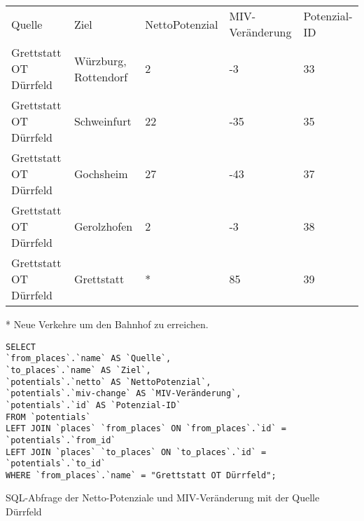 \begin{tabular}{ l  l  l  l  l }
Quelle & Ziel & NettoPotenzial & MIV-Veränderung & Potenzial-ID\\ 
Grettstatt OT Dürrfeld & Würzburg, Rottendorf & 2 & -3 & 33\\ 
Grettstatt OT Dürrfeld & Schweinfurt & 22 & -35 & 35\\ 
Grettstatt OT Dürrfeld & Gochsheim & 27 & -43 & 37\\ 
Grettstatt OT Dürrfeld & Gerolzhofen & 2 & -3 & 38\\ 
Grettstatt OT Dürrfeld & Grettstatt & * & 85 & 39\\ 
\end{tabular}       
\newline
\newline
* Neue Verkehre um den Bahnhof zu erreichen.
\newline
\begin{listing}[htbp]
\begin{verbatim}
SELECT
`from_places`.`name` AS `Quelle`, 
`to_places`.`name` AS `Ziel`, 
`potentials`.`netto` AS `NettoPotenzial`, 
`potentials`.`miv-change` AS `MIV-Veränderung`, 
`potentials`.`id` AS `Potenzial-ID`
FROM `potentials`
LEFT JOIN `places` `from_places` ON `from_places`.`id` = `potentials`.`from_id`
LEFT JOIN `places` `to_places` ON `to_places`.`id` = `potentials`.`to_id`
WHERE `from_places`.`name` = "Grettstatt OT Dürrfeld";
\end{verbatim}
\caption{SQL-Abfrage der Netto-Potenziale und MIV-Veränderung mit der Quelle Dürrfeld}\label{lst-fz-duerrfeld}
\end{listing}